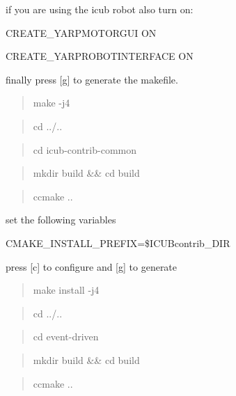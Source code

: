 if you are using the icub robot also turn on\+:


\begin{DoxyItemize}
\item C\+R\+E\+A\+T\+E\+\_\+\+Y\+A\+R\+P\+M\+O\+T\+O\+R\+G\+UI ON
\item C\+R\+E\+A\+T\+E\+\_\+\+Y\+A\+R\+P\+R\+O\+B\+O\+T\+I\+N\+T\+E\+R\+F\+A\+CE ON
\end{DoxyItemize}

finally press \mbox{[}g\mbox{]} to generate the makefile.

\begin{quote}
make -\/j4 \end{quote}


\begin{quote}
cd ../.. \end{quote}


\begin{quote}
cd icub-\/contrib-\/common \end{quote}


\begin{quote}
mkdir build \&\& cd build \end{quote}


\begin{quote}
ccmake .. \end{quote}


set the following variables


\begin{DoxyItemize}
\item C\+M\+A\+K\+E\+\_\+\+I\+N\+S\+T\+A\+L\+L\+\_\+\+P\+R\+E\+F\+IX=\$\+I\+C\+U\+Bcontrib\+\_\+\+D\+IR
\end{DoxyItemize}

press \mbox{[}c\mbox{]} to configure and \mbox{[}g\mbox{]} to generate

\begin{quote}
make install -\/j4 \end{quote}


\begin{quote}
cd ../.. \end{quote}


\begin{quote}
cd event-\/driven \end{quote}


\begin{quote}
mkdir build \&\& cd build \end{quote}


\begin{quote}
ccmake .. \end{quote}


